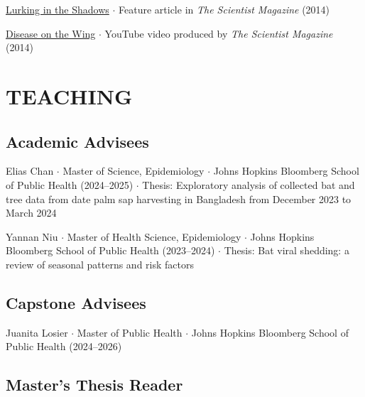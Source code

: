 \documentclass{cv}
\begin{document}
\href{https://www.the-scientist.com/features/lurking-in-the-shadows-36302}{Lurking in the Shadows} $\cdot$ Feature article in \textit{The Scientist Magazine} (2014)

\href{https://youtu.be/p6I0kRVGyo4}{Disease on the Wing} $\cdot$ YouTube video produced by \textit{The Scientist Magazine} (2014)


\newpage
{}
\parttwo



\section*{TEACHING}

\subsection*{Academic Advisees}

Elias Chan $\cdot$ Master of Science, Epidemiology $\cdot$ Johns Hopkins Bloomberg School of Public Health (2024--2025) $\cdot$ Thesis: Exploratory analysis of collected bat and tree data from date palm sap harvesting in Bangladesh from December 2023 to March 2024

Yannan Niu $\cdot$ Master of Health Science, Epidemiology $\cdot$ Johns Hopkins Bloomberg School of Public Health (2023--2024) $\cdot$ Thesis: Bat viral shedding: a review of seasonal patterns and risk factors

\subsection*{Capstone Advisees}

Juanita Losier $\cdot$ Master of Public Health $\cdot$ Johns Hopkins Bloomberg School of Public Health (2024--2026)

\subsection*{Master's Thesis Reader}
\end{document}
